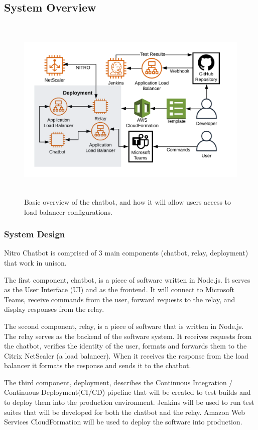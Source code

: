 \subsection{System Overview}
\begin{figure}[h]
    \centering
    \captionsetup{format=hang,justification=raggedright,margin=2cm}
    \includegraphics[height=9cm]{overview-v3.png}
    \caption[Basic overview of the chatbot]{Basic overview of the chatbot, and how it will allow users access to load balancer configurations.}
    \label{fig:Nitro Chatbot}
\end{figure}
\subsubsection{System Design}
Nitro Chatbot is comprised of 3 main components (chatbot, relay, deployment) that work in unison.

The first component, chatbot, is a piece of software written in Node.js.
It serves as the User Interface (UI) and as the frontend.
It will connect to Microsoft Teams, receive commands from the user, forward requests to the relay, and display responses from the relay.

The second component, relay, is a piece of software that is written in Node.js.
The relay serves as the backend of the software system.
It receives requests from the chatbot, verifies the identity of the user, formats and forwards them to the Citrix NetScaler (a load balancer). 
When it receives the response from the load balancer it formats the response and sends it to the chatbot.

The third component, deployment, describes the Continuous Integration / Continuous Deployment(CI/CD) pipeline that will be created to test builds and to deploy them into the production environment.
Jenkins will be used to run test suites that will be developed for both the chatbot and the relay.
Amazon Web Services CloudFormation will be used to deploy the software into production.

